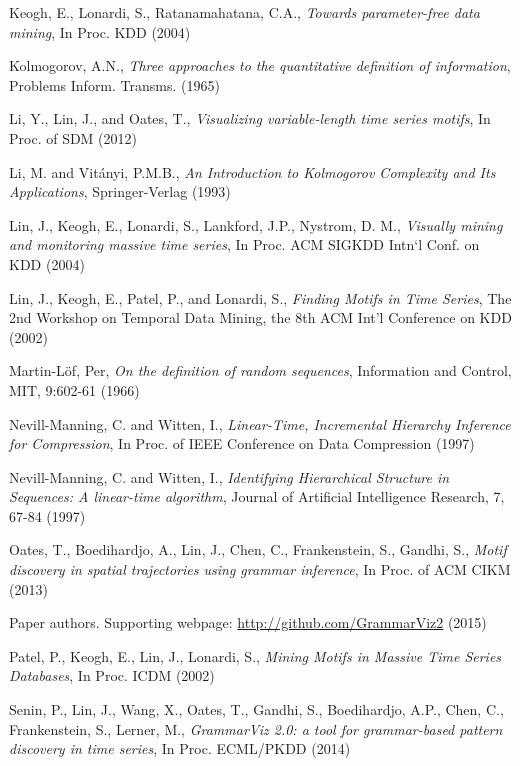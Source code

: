 \documentclass{sig-alternate}
\begin{document}
\begin{thebibliography}{99}
Keogh, E., Lonardi, S., Ratanamahatana, C.A.,
{\em Towards parameter-free data mining},
In Proc. KDD (2004)

Kolmogorov, A.N.,
{\em Three approaches to the quantitative definition of information},
Problems Inform. Transms. (1965)

Li, Y., Lin, J., and Oates, T.,
{\em Visualizing variable-length time series motifs},
In Proc. of SDM (2012)

Li, M. and Vit{\'a}nyi, P.M.B.,
{\em An Introduction to Kolmogorov Complexity and Its Applications},
Springer-Verlag (1993)

Lin, J., Keogh, E., Lonardi, S., Lankford, J.P., Nystrom, D. M.,
{\em Visually mining and monitoring massive time series},
In Proc. ACM SIGKDD Intn`l Conf. on KDD (2004)

Lin, J., Keogh, E., Patel, P., and Lonardi, S.,
{\em Finding Motifs in Time Series},
The 2nd Workshop on Temporal Data Mining, the 8th ACM Int'l Conference on KDD (2002)

Martin-L\"{o}f, Per,
{\em On the definition of random sequences},
Information and Control, MIT, 9:602-61 (1966)

Nevill-Manning, C. and Witten, I.,
{\em Linear-Time, Incremental Hierarchy Inference for Compression},
In Proc. of IEEE Conference on Data Compression (1997)

Nevill-Manning, C. and Witten, I.,
{\em Identifying Hierarchical Structure in Sequences: A linear-time algorithm},
Journal of Artificial Intelligence Research, 7, 67-84 (1997)

Oates, T., Boedihardjo, A., Lin, J., Chen, C., Frankenstein, S., Gandhi, S.,
{\em Motif discovery in spatial trajectories using grammar inference},
In Proc. of ACM CIKM (2013)

Paper authors. Supporting webpage:
\url{http://github.com/GrammarViz2} (2015)

Patel, P., Keogh, E., Lin, J., Lonardi, S.,
{\em Mining Motifs in Massive Time Series Databases},
In Proc. ICDM (2002)

Senin, P., Lin, J., Wang, X., Oates, T., Gandhi, S., Boedihardjo, A.P., Chen, C., Frankenstein, S., Lerner, M.,
{\em GrammarViz 2.0: a tool for grammar-based pattern discovery in time series},
In Proc. ECML/PKDD (2014)


\end{thebibliography}
\end{document}
